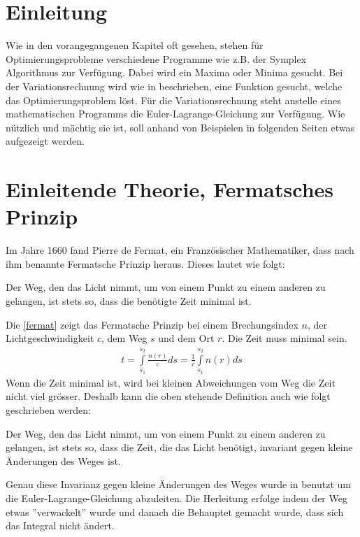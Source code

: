 \section{Einleitung}
Wie in den vorangegangenen Kapitel oft gesehen, stehen für Optimierungsprobleme verschiedene Programme wie z.B. der Symplex Algorithmus zur Verfügung. Dabei wird ein Maxima oder Minima gesucht. Bei der Variationsrechnung wird wie in  beschrieben, eine Funktion gesucht, welche das Optimierungsproblem löst. Für die Variationsrechnung steht anstelle eines mathematischen Programms die Euler-Lagrange-Gleichung zur Verfügung. Wie nützlich und mächtig sie ist, soll anhand von Beispielen in folgenden Seiten etwas aufgezeigt werden.
\section{Einleitende Theorie, Fermatsches Prinzip}
Im Jahre 1660 fand Pierre de Fermat, ein Französischer Mathematiker, dass  nach ihm benannte Fermatsche Prinzip heraus. 
Dieses lautet wie folgt:
\begin{postulat}
	Der Weg, den das Licht nimmt, 
	um von einem Punkt zu einem anderen zu gelangen, 
	ist stets so, dass die benötigte Zeit minimal ist. \cite{DefinitionFermat}
\end{postulat}
Die \eqref{fermat} zeigt das Fermatsche Prinzip bei einem Brechungsindex $n$, 
der Lichtgeschwindigkeit $c$, dem Weg $s$ und dem Ort $r$. Die Zeit muss minimal sein.
\begin{align}
	t= \int\limits_{s_1}^{s_2} \frac{n(r)}{c} ds = \frac{1}{c} \int\limits_{s_1}^{s_2} n(r) ds
	\label{fermat}
\end{align}
Wenn die Zeit minimal ist, wird bei kleinen Abweichungen vom Weg die Zeit nicht viel grösser. 
Deshalb kann die oben stehende Definition auch wie folgt geschrieben werden:
\begin{postulat}
Der Weg, den das Licht nimmt,  um von einem Punkt zu einem anderen zu gelangen, 
ist stets so, dass die Zeit, die das Licht benötigt, invariant gegen kleine Änderungen des Weges ist.  \cite{DefinitionFermat}
\end{postulat}
Genau diese Invarianz gegen kleine Änderungen des Weges wurde in  benutzt um die Euler-Lagrange-Gleichung abzuleiten. Die Herleitung erfolge indem der Weg etwas ''verwackelt'' wurde und danach die Behauptet gemacht wurde, dass sich das Integral nicht ändert.
